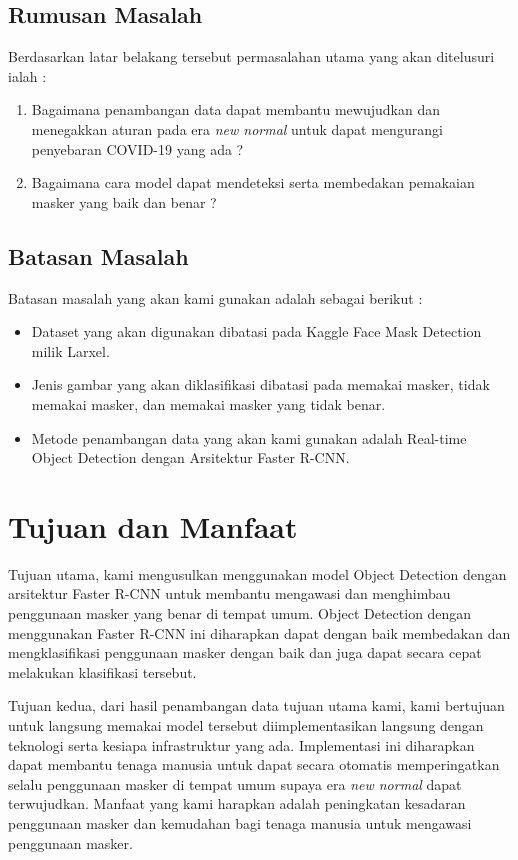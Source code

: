 \documentclass{article}
\begin{document}
  	\subsection{Rumusan Masalah}
  		Berdasarkan latar belakang tersebut permasalahan utama yang akan ditelusuri ialah :
  		\begin{enumerate}
  			\item Bagaimana penambangan data dapat membantu mewujudkan dan menegakkan aturan pada era \textit{new normal} untuk dapat mengurangi penyebaran COVID-19 yang ada ?
  			\item Bagaimana cara model dapat mendeteksi serta membedakan pemakaian masker yang baik dan benar ?

  		\end{enumerate}
  	\subsection{Batasan Masalah}
  		Batasan masalah yang akan kami gunakan adalah sebagai berikut :
  		\begin{itemize}
  			\item Dataset yang akan digunakan dibatasi pada Kaggle Face Mask Detection milik Larxel\cite{larxel_2020}.
  			\item Jenis gambar yang akan diklasifikasi dibatasi pada memakai masker, tidak memakai masker, dan memakai masker yang tidak benar.
  			\item Metode penambangan data yang akan kami gunakan adalah Real-time Object Detection dengan Arsitektur Faster R-CNN\cite{NIPS2015_14bfa6bb}.
  		\end{itemize}
  \section{Tujuan dan Manfaat}
  		\par Tujuan utama, kami mengusulkan menggunakan model Object Detection dengan arsitektur Faster R-CNN untuk membantu mengawasi dan menghimbau penggunaan masker yang benar di tempat umum. Object Detection dengan menggunakan Faster R-CNN ini diharapkan dapat dengan baik membedakan dan mengklasifikasi penggunaan masker dengan baik dan juga dapat secara cepat melakukan klasifikasi tersebut.
  		
  		\par Tujuan kedua, dari hasil penambangan data tujuan utama kami, kami bertujuan untuk langsung memakai model tersebut diimplementasikan langsung dengan teknologi serta kesiapa infrastruktur yang ada. Implementasi ini diharapkan dapat membantu tenaga manusia untuk dapat secara otomatis memperingatkan selalu penggunaan masker di tempat umum supaya era \textit{new normal} dapat terwujudkan. Manfaat yang kami harapkan adalah peningkatan kesadaran penggunaan masker dan kemudahan bagi tenaga manusia untuk mengawasi penggunaan masker.
\end{document}

